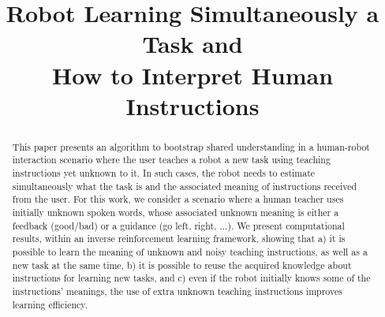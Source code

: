 \documentclass[conference]{IEEEtran}
\begin{document}
\title{Robot Learning Simultaneously a Task and \\ How to Interpret Human Instructions}


\author{
\and
{}
\and
{}
}




\maketitle

\begin{abstract}
This paper presents an algorithm to bootstrap shared understanding in a human-robot interaction scenario where the user teaches a robot a new task using teaching instructions yet unknown to it. In such cases, the robot needs to estimate simultaneously what the task is and the associated meaning of instructions received from the user. For this work, we consider a scenario where a human teacher uses initially unknown spoken words, whose associated unknown meaning is either a feedback (good/bad) or a guidance (go left, right, ...). We present computational results, within an inverse reinforcement learning framework, showing that a) it is possible to learn the meaning of unknown and noisy teaching instructions, as well as a new task at the same time, b) it is possible to reuse the acquired knowledge about instructions for learning new tasks, and c) even if the robot initially knows some of the instructions' meanings, the use of extra unknown teaching instructions improves learning efficiency.
\end{abstract}
\maketitle




%
\end{document}
